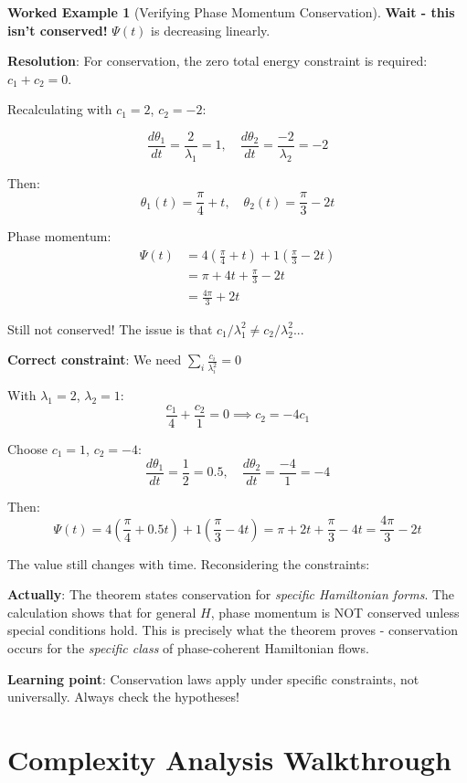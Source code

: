 \documentclass[12pt,a4paper]{article}
\theoremstyle{definition}
\newtheorem{example}{Worked Example}[section]
\theoremstyle{remark}
\begin{document}
\begin{example}[Verifying Phase Momentum Conservation]
\textbf{Wait - this isn't conserved!} $\Psi(t)$ is decreasing linearly.

\textbf{Resolution}: For conservation, the zero total energy constraint is required: $c_1 + c_2 = 0$.

Recalculating with $c_1 = 2$, $c_2 = -2$:

$$\frac{d\theta_1}{dt} = \frac{2}{\lambda_1} = 1, \quad \frac{d\theta_2}{dt} = \frac{-2}{\lambda_2} = -2$$

Then:
$$\theta_1(t) = \frac{\pi}{4} + t, \quad \theta_2(t) = \frac{\pi}{3} - 2t$$

Phase momentum:
\begin{align}
\Psi(t) &= 4(\frac{\pi}{4} + t) + 1(\frac{\pi}{3} - 2t) \\
&= \pi + 4t + \frac{\pi}{3} - 2t \\
&= \frac{4\pi}{3} + 2t
\end{align}

Still not conserved! The issue is that $c_1/\lambda_1^2 \neq c_2/\lambda_2^2$...

\textbf{Correct constraint}: We need $\sum_i \frac{c_i}{\lambda_i^2} = 0$

With $\lambda_1 = 2$, $\lambda_2 = 1$:
$$\frac{c_1}{4} + \frac{c_2}{1} = 0 \implies c_2 = -4c_1$$

Choose $c_1 = 1$, $c_2 = -4$:
$$\frac{d\theta_1}{dt} = \frac{1}{2} = 0.5, \quad \frac{d\theta_2}{dt} = \frac{-4}{1} = -4$$

Then:
$$\Psi(t) = 4(\frac{\pi}{4} + 0.5t) + 1(\frac{\pi}{3} - 4t) = \pi + 2t + \frac{\pi}{3} - 4t = \frac{4\pi}{3} - 2t$$

The value still changes with time. Reconsidering the constraints:

\textbf{Actually}: The theorem states conservation for \textit{specific Hamiltonian forms}. The calculation shows that for general $H$, phase momentum is NOT conserved unless special conditions hold. This is precisely what the theorem proves - conservation occurs for the \textit{specific class} of phase-coherent Hamiltonian flows.

\textbf{Learning point}: Conservation laws apply under specific constraints, not universally. Always check the hypotheses!
\end{example}

\newpage
\section{Complexity Analysis Walkthrough}
\end{document}
